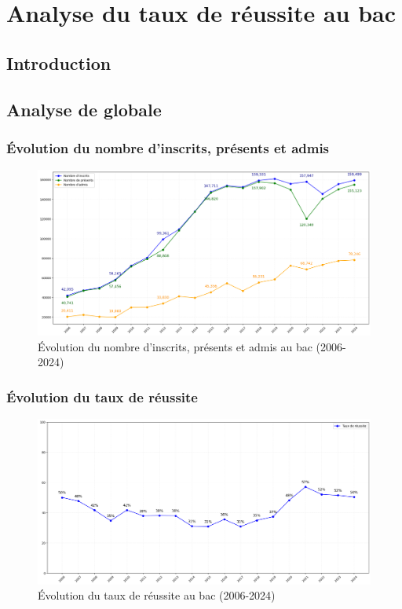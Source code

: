 \chapter{Analyse du taux de réussite au bac}
\section{Introduction}

\section{Analyse de globale} 
\subsection{Évolution du nombre d'inscrits, présents et admis}

\begin{figure}[h]
\centering
\caption{Évolution du nombre d'inscrits, présents et admis au bac (2006-2024)}
\includegraphics[width=1\textwidth]{figure/Inscrits_bac.png}
\end{figure}

\subsection{Évolution du taux de réussite}

\begin{figure}[h]
\centering
\caption{Évolution du taux de réussite au bac (2006-2024)}
\includegraphics[width=1\textwidth]{figure/taux_bac.png}
\end{figure}

